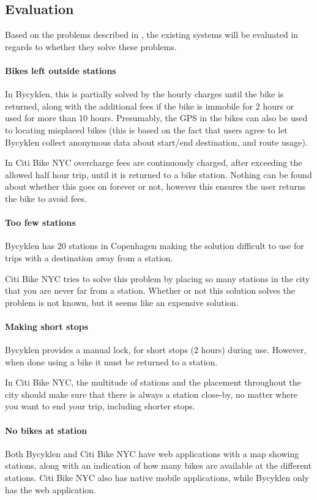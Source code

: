 \subsection{Evaluation}
Based on the problems described in , the existing systems will be evaluated in regards to whether they solve these problems.

\paragraph{Bikes left outside stations}
In Bycyklen, this is partially solved by the hourly charges until the bike is returned, along with the additional fees if the bike is immobile for 2 hours or used for more than 10 hours.
Presumably, the GPS in the bikes can also be used to locating misplaced bikes (this is based on the fact that users agree to let Bycyklen collect anonymous data about start/end destination, and route usage).

In Citi Bike NYC overcharge fees are continuously charged, after exceeding the allowed half hour trip, until it is returned to a bike station.
Nothing can be found about whether this goes on forever or not, however this ensures the user returns the bike to avoid fees.

\paragraph{Too few stations}
Bycyklen has 20 stations in Copenhagen making the solution difficult to use for trips with a destination away from a station. 

Citi Bike NYC tries to solve this problem by placing so many stations in the city that you are never far from a station.
Whether or not this solution solves the problem is not known, but it seems like an expensive solution.

\paragraph{Making short stops}
Bycyklen provides a manual lock, for short stops (2 hours) during use.
However, when done using a bike it must be returned to a station.

In Citi Bike NYC, the multitude of stations and the placement throughout the city should make sure that there is always a station close-by, no matter where you want to end your trip, including shorter stops.

\paragraph{No bikes at station}
Both Bycyklen and Citi Bike NYC have web applications with a map showing stations, along with an indication of how many bikes are available at the different stations.
Citi Bike NYC also has native mobile applications, while Bycyklen only has the web application.

